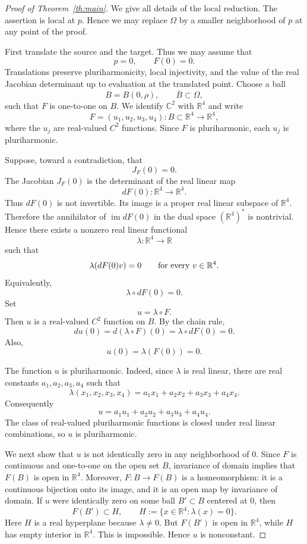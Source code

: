 \documentclass[11pt]{amsart}
\theoremstyle{definition}
\theoremstyle{remark}
\newcommand{\C}{\mathbb C}
\newcommand{\R}{\mathbb R}
\begin{document}
\begin{proof}[Proof of Theorem~\ref{th:main}]
We give all details of the local reduction. The assertion is local at
$p$. Hence we may replace $\Omega$ by a smaller neighborhood of $p$ at
any point of the proof.

First translate the source and the target. Thus we may assume that
\[
        p=0,
        \qquad
        F(0)=0.
\]
Translations preserve pluriharmonicity, local injectivity, and the value
of the real Jacobian determinant up to evaluation at the translated
point. Choose a ball
\[
        B=B(0,\rho),
        \qquad
        \overline B\subset \Omega,
\]
such that $F$ is one-to-one on $B$. We identify $\C^2$ with $\R^4$
and write
\[
        F=(u_1,u_2,u_3,u_4):B\subset\R^4\longrightarrow\R^4,
\]
where the $u_j$ are real-valued $C^2$ functions. Since $F$ is
pluriharmonic, each $u_j$ is pluriharmonic.

Suppose, toward a contradiction, that
\[
        J_F(0)=0.
\]
The Jacobian $J_F(0)$ is the determinant of the real linear map
\[
        dF(0):\R^4\longrightarrow\R^4.
\]
Thus $dF(0)$ is not invertible. Its image is a proper real linear
subspace of $\R^4$. Therefore the annihilator of $\operatorname{im}dF(0)$
in the dual space $(\R^4)^*$ is nontrivial. Hence there exists a
nonzero real linear functional
\[
        \lambda:\R^4\longrightarrow\R
\]
such that
\[
        \lambda(dF(0)v)=0
        \qquad
        \hbox{for every }v\in\R^4.
\]
Equivalently,
\[
        \lambda\circ dF(0)=0.
\]
Set
\[
        u=\lambda\circ F.
\]
Then $u$ is a real-valued $C^2$ function on $B$. By the chain rule,
\[
        du(0)=d(\lambda\circ F)(0)=\lambda\circ dF(0)=0.
\]
Also,
\[
        u(0)=\lambda(F(0))=0.
\]

The function $u$ is pluriharmonic. Indeed, since $\lambda$ is real
linear, there are real constants $a_1,a_2,a_3,a_4$ such that
\[
        \lambda(x_1,x_2,x_3,x_4)
        =a_1x_1+a_2x_2+a_3x_3+a_4x_4.
\]
Consequently
\[
        u=a_1u_1+a_2u_2+a_3u_3+a_4u_4.
\]
The class of real-valued pluriharmonic functions is closed under real
linear combinations, so $u$ is pluriharmonic.

We next show that $u$ is not identically zero in any neighborhood of
$0$. Since $F$ is continuous and one-to-one on the open set $B$,
invariance of domain implies that $F(B)$ is open in $\R^4$. Moreover,
$F:B\to F(B)$ is a homeomorphism: it is a continuous bijection onto its
image, and it is an open map by invariance of domain. If $u$ were
identically zero on some ball $B'\subset B$ centered at $0$, then
\[
        F(B')\subset H,
        \qquad
        H:=\{x\in\R^4:\lambda(x)=0\}.
\]
Here $H$ is a real hyperplane because $\lambda\ne0$. But $F(B')$ is
open in $\R^4$, while $H$ has empty interior in $\R^4$. This is
impossible. Hence $u$ is nonconstant.


\end{proof}
\end{document}
